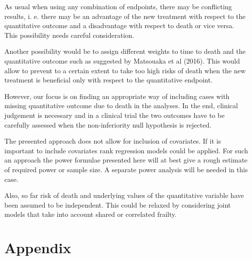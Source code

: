 \documentclass[bimj,fleqn]{w-art}\usepackage[]{graphicx}\usepackage[]{color}
\theoremstyle{plain}
\theoremstyle{definition}
\begin{document}
As usual when using any combination of endpoints, there may be conflicting
results, i. e. there may be an advantage of the new treatment with respect to
the quantitative outcome and a disadvantage with respect to death or vice versa.
This possibility needs careful consideration.

Another possibility would be to assign different weights to time to death and
the quantitative outcome such as suggested by Matsouaka et al (2016). This would
allow to prevent to a certain extent to take too high risks of death when the
new treatment is beneficial only with respect to the quantitative endpoint.

However, our focus is on finding an appropriate way of including cases with
missing quantitative outcome due to death in the analyses. In the end, clinical
judgement is necessary and in a clinical trial the two outcomes have to be
carefully assessed when the non-inferiority null hypothesis is rejected.

The presented approach does not allow for inclusion of covariates. If it is
important to include covariates rank regression models could be applied.
For such an approach the power formulae presented here will at best give a rough
estimate of required power or sample size. A separate power analysis will be
needed in this case.

Also, so far risk of death and underlying values of the quantitative variable
have been assumed to be independent. This could be relaxed by considering joint
models that take into account shared or correlated frailty.

\section*{Appendix}
\end{document}

